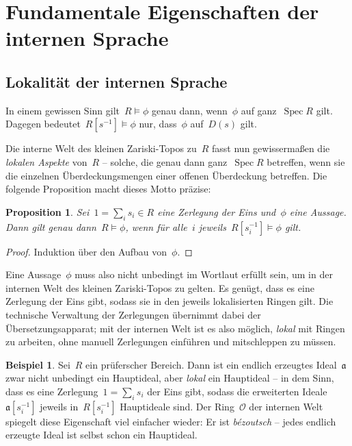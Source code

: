 \documentclass[a4paper,ngerman,12pt]{scrartcl}
\theoremstyle{definition}
\newtheorem{bsp}[defn]{Beispiel}
\theoremstyle{plain}
\newtheorem{prop}[defn]{Proposition}
\theoremstyle{remark}
\renewcommand{\aa}{\mathfrak{a}}
\renewcommand{\O}{\mathcal{O}}
\DeclareMathOperator{\Spec}{Spec}
\renewcommand{\_}{\mathpunct{.}\,}
\newcommand{\?}{\,{:}\,}
\begin{document}
\section{Fundamentale Eigenschaften der internen Sprache}

\subsection{Lokalität der internen Sprache}

In einem gewissen Sinn gilt~$R \models \phi$ genau dann, wenn~$\phi$ auf ganz~$\Spec R$
gilt. Dagegen bedeutet~$R[s^{-1}] \models \phi$ nur, dass~$\phi$ auf~$D(s)$
gilt.

Die interne Welt des kleinen Zariski-Topos zu~$R$ fasst nun gewissermaßen die
\emph{lokalen Aspekte} von~$R$ -- solche, die genau dann ganz~$\Spec R$
betreffen, wenn sie die einzelnen Überdeckungsmengen einer offenen
Überdeckung betreffen. Die folgende Proposition macht dieses Motto präzise:
\begin{prop}Sei~$1 = \sum_i s_i \in R$ eine Zerlegung der Eins und~$\phi$ eine
Aussage. Dann gilt genau dann~$R \models \phi$, wenn für alle~$i$
jeweils~$R[s_i^{-1}] \models \phi$ gilt.\end{prop}
\begin{proof}Induktion über den Aufbau von~$\phi$.\end{proof}

Eine Aussage~$\phi$ muss also nicht unbedingt im Wortlaut erfüllt sein, um in
der internen Welt des kleinen Zariski-Topos zu gelten. Es genügt, dass es
eine Zerlegung der Eins gibt, sodass sie in den jeweils lokalisierten Ringen gilt.
Die technische Verwaltung der Zerlegungen übernimmt dabei der
Übersetzungsapparat; mit der internen Welt ist es also möglich, \emph{lokal}
mit Ringen zu arbeiten, ohne manuell Zerlegungen einführen und mitschleppen
zu müssen.

\begin{bsp}\label{lokal-hauptideale}%
Sei~$R$ ein prüferscher Bereich. Dann ist ein endlich erzeugtes
Ideal~$\aa$ zwar nicht unbedingt ein Hauptideal, aber \emph{lokal} ein
Hauptideal -- in dem Sinn, dass es eine Zerlegung~$1 = \sum_i s_i$ der Eins
gibt, sodass die erweiterten Ideale~$\aa[s_i^{-1}]$ jeweils in~$R[s_i^{-1}]$
Hauptideale sind. Der Ring~$\O$ der internen Welt spiegelt diese Eigenschaft
viel einfacher wieder: Er ist \emph{bézoutsch} -- jedes endlich
erzeugte Ideal ist selbst schon ein Hauptideal.\end{bsp}
\end{document}
